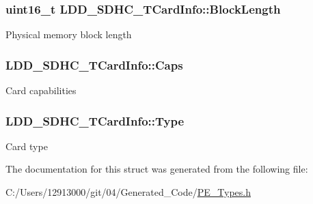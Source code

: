 \subsubsection[{Block\+Length}]{\setlength{\rightskip}{0pt plus 5cm}uint16\+\_\+t L\+D\+D\+\_\+\+S\+D\+H\+C\+\_\+\+T\+Card\+Info\+::\+Block\+Length}\label{struct_l_d_d___s_d_h_c___t_card_info_a46cbdea4ece83eeaa17410e9763cc3a9}
Physical memory block length \hypertarget{struct_l_d_d___s_d_h_c___t_card_info_a591c22d1aa49944325b35c63d2bf8199}{}
\subsubsection[{Caps}]{ L\+D\+D\+\_\+\+S\+D\+H\+C\+\_\+\+T\+Card\+Info\+::\+Caps}\label{struct_l_d_d___s_d_h_c___t_card_info_a591c22d1aa49944325b35c63d2bf8199}
Card capabilities \hypertarget{struct_l_d_d___s_d_h_c___t_card_info_ab2b86f6fe821778459edd351d08eb4bd}{}
\subsubsection[{Type}]{ L\+D\+D\+\_\+\+S\+D\+H\+C\+\_\+\+T\+Card\+Info\+::\+Type}\label{struct_l_d_d___s_d_h_c___t_card_info_ab2b86f6fe821778459edd351d08eb4bd}
Card type 

The documentation for this struct was generated from the following file\+:\begin{DoxyCompactItemize}
\item 
C\+:/\+Users/12913000/git/04/\+Generated\+\_\+\+Code/\hyperlink{_p_e___types_8h}{P\+E\+\_\+\+Types.\+h}\end{DoxyCompactItemize}
